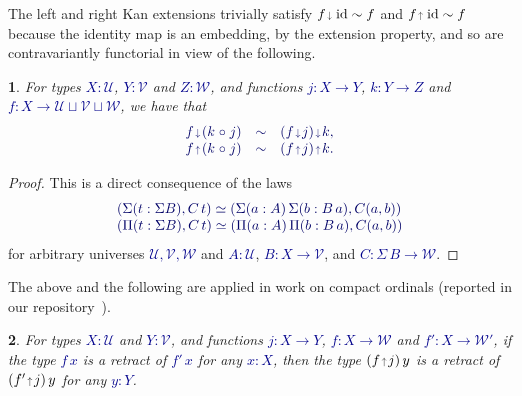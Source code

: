 \documentclass[10pt]{article}
\newcommand{\db}{\textcolor{darkblue}}
\newcommand{\m}[1]{\db{$#1$}}
\newcommand{\M}[1]{\[\db{#1}\]}
\newcommand{\id}{\operatorname{id}}
\newcommand{\comp}{\mathrel{\circ}}
\newcommand{\U}{\mathcal{U}}
\newcommand{\V}{\mathcal{V}}
\newcommand{\W}{\mathcal{W}}
\newcommand{\edown}{\scaleobj{0.7}{\,\downarrow\,}}
\newcommand{\eup}{\scaleobj{0.7}{\,\uparrow\,}}
\newcommand{\wps}{\mathrel{\,\,\preceq\,\,}}
\newtheorem{numbered}{}
\theoremstyle{definition}
\begin{document}
The left and right Kan extensions trivially satisfy \m{f \edown \id \sim f}
and \m{f \eup \id \sim f} because the identity map is an embedding, by
the extension property, and so are contravariantly functorial in view
of the following.
\begin{numbered} \label{iterated}
  For types \m{X : \U}, \m{Y : \V} and \m{Z : \W}, and functions \m{j : X \to Y}, \m{k : Y \to Z} and \m{f : X \to \U \sqcup \V \sqcup \W}, we have that
%
  \M{
    \begin{array}{lll}
      f \edown (k \comp j)  & \sim & (f \edown j) \edown k, \\
    f \eup (k \comp j)  & \sim & (f \eup j) \eup k.
    \end{array}
  }
\end{numbered}
\begin{proof}
This is a direct consequence of the laws
  \M{
    \begin{array}{lll}
      (\Sigma (t : \Sigma B) , C \, t) \simeq (\Sigma (a : A)\,
    \Sigma (b : B \, a), C(a,b)) \\
      (\Pi (t : \Sigma B) , C \, t) \simeq (\Pi (a : A)\,
    \Pi (b : B \, a), C(a,b))
    \end{array}
  }
  for arbitrary universes \m{\U,\V,\W} and \m{A:\U}, \m{B: X \to \V}, and \m{C : \Sigma \, B \to \W}.
\end{proof}

The above and the following are applied in work on
compact ordinals (reported in our repository~\cite{TypeTopology}).
\begin{numbered}
  For types \m{X : \U} and \m{Y : \V}, and functions \m{j : X \to Y}, \m{f : X \to \W}
  and \m{f' : X \to \W'}, if the type \m{f \, x} is a retract of \m{f'
    \, x} for any
  \m{x:X}, then the type \m{(f \eup j) \, y} is a
  retract of \m{(f' \eup j) \, y} for any \m{y : Y}.
\end{numbered}
\end{document}
